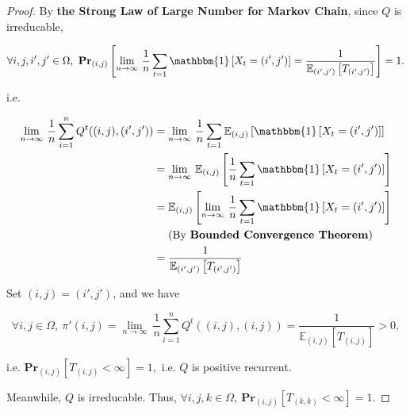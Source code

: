 \documentclass{article}
\renewcommand{\Pr}[2]{\mathbf{Pr}_{#1}\left[#2\right]}
\newcommand{\staExp}[2]{\mathbb{E}_{#1}\left[#2\right]}
\begin{document}
\begin{proof}
    \hspace{1.3em}
    By \textbf{the Strong Law of Large Number for Markov Chain}, since $Q$ is irreducable, 
    
    \vspace{-0.5em}
    $$\forall i,j,i',j'\in\Omega,\ \Pr{(i,j)}{\underset{n\rightarrow\infty}{\lim}\ \frac{1}{n}\sum_{t=1}{\mathbbm{1}\left[X_t=(i',j')\right]}=\frac{1}{\staExp{(i',j')}{T_{(i',j')}}}}=1.$$
    
    \vspace{0.3em} \hspace{1.3em}
    i.e.
    
    \vspace{-5.1em}
    \begin{align*}
        \underset{n\rightarrow\infty}{\lim}\ \frac{1}{n}\sum_{i=1}^n Q^t((i,j),(i',j')) & = \underset{n\rightarrow\infty}{\lim}\ \frac{1}{n}\sum_{t=1}{\staExp{(i,j)}{\mathbbm{1}\left[X_t=(i',j')\right]}} \\
        & = \underset{n\rightarrow\infty}{\lim}\ {\staExp{(i,j)}{\frac{1}{n}\sum_{t=1}\mathbbm{1}\left[X_t=(i',j')\right]}} \\
        & = \staExp{(i,j)}{\underset{n\rightarrow\infty}{\lim}\ \frac{1}{n}\sum_{t=1}\mathbbm{1}\left[X_t=(i',j')\right]} \\
        &\quad \text{ (By \textbf{Bounded Convergence Theorem})}\\
        & = \frac{1}{\staExp{(i',j')}{T_{(i',j')}}}
    \end{align*}
    
    \hspace{1.3em}
    Set $(i,j)=(i',j')$, and we have
    
    \vspace{-0.5em}
    $$\forall i,j\in\Omega,\ \pi'(i,j) = \underset{n\rightarrow\infty}{\lim}\ \frac{1}{n}\sum_{i=1}^n Q^t((i,j),(i,j)) = \frac{1}{\staExp{(i,j)}{T_{(i,j)}}} > 0,$$
    
    \hspace{1.3em}
    i.e. $\Pr{(i,j)}{T_{(i,j)}<\infty}=1,$ i.e. $Q$ is positive recurrent.
    
    \vspace{0.3em} \hspace{1.3em}
    Meanwhile, $Q$ is irreducable. Thus, $\forall i,j,k\in\Omega,\ \Pr{(i,j)}{T_{(k,k)}<\infty}=1$.
\end{proof}

\vspace{2em}
\end{document}
